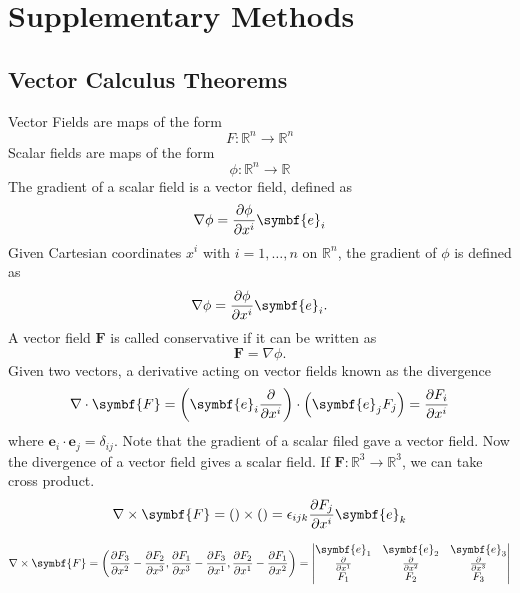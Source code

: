 \appendix




\chapter{Supplementary Methods}

\section{Vector Calculus Theorems}

Vector Fields are maps of the form
\begin{equation*}
	F\colon\mathbb{R}^{n}\to\mathbb{R}^{n}
\end{equation*}
Scalar fields are maps of the form
\begin{equation*}
	\phi\colon\mathbb{R}^{n}\to\mathbb{R}
\end{equation*}
The gradient of a scalar field is a vector field, defined as
\begin{equation*}
	\nabla\phi=
	\diffp{\phi}{x^{i}}\symbf{e}_{i}
\end{equation*}
Given Cartesian coordinates $x^{i}$ with $i=1,\dotsc,n$ on $\mathbb{R}^{n}$,
the gradient of $\phi$ is defined as
\begin{equation*}
	\nabla\phi=
	\diffp{\phi}{x^{i}}\symbf{e}_{i}.
\end{equation*}
A vector field $\symbf{F}$ is called conservative if it can be written as
\begin{equation*}
	\symbf{F}=\nabla\phi.
\end{equation*}
Given two vectors, a derivative acting on vector fields known as the divergence
\begin{equation*}
	\nabla\cdot\symbf{F}=
	\left(\symbf{e}_{i}\diffp{}{x^{i}}\right)\cdot
	\left(\symbf{e}_{j}F_{j}\right)=
	\diffp{F_{i}}{x^{i}}
\end{equation*}
where $\symbf{e}_{i}\cdot\symbf{e}_{j}=\delta_{ij}$.
Note that the gradient of a scalar filed gave a vector field.
Now the divergence of a vector field gives a scalar field.
If $\symbf{F}\colon\mathbb{R}^{3}\to\mathbb{R}^{3}$, we can take cross product.
\begin{equation*}
	\nabla\times\symbf{F}=
	\left(\right)\times\left(\right)=
	\epsilon_{ijk}\diffp{F_{j}}{x^{i}}\symbf{e}_{k}
\end{equation*}

\begin{equation*}
	\nabla\times\symbf{F}=
	\left(
	\diffp{F_{3}}{x^{2}}-\diffp{F_{2}}{x^{3}},
	\diffp{F_{1}}{x^{3}}-\diffp{F_{3}}{x^{1}},
	\diffp{F_{2}}{x^{1}}-\diffp{F_{1}}{x^{2}}
	\right)=
	\begin{vmatrix}
		\symbf{e}_{1}   & \symbf{e}_{2}   & \symbf{e}_{3}   \\
		\diffp{}{x^{1}} & \diffp{}{x^{2}} & \diffp{}{x^{3}} \\
		F_{1}           & F_{2}           & F_{3}
	\end{vmatrix}
\end{equation*}

